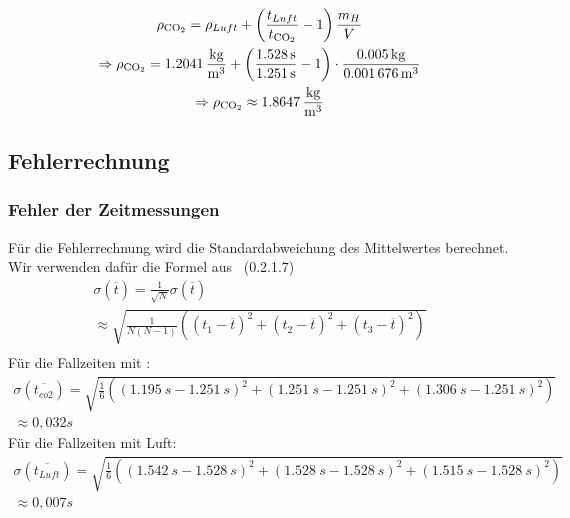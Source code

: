 \documentclass{article}
\begin{document}
      \begin{equation}
          \begin{gathered}
              \rho_{\ce{CO2}} = \rho_{Luft} + \left( \frac{t_{Luft}}{t_{\ce{CO2}}} - 1 \right) \frac{m_H}{V} \\
              \Rightarrow \rho_{\ce{CO2}} = \SI{ 1,2041 }{ \frac{kg}{m^3} } + \left( \frac{ \SI{1,528}{s} }{ \SI{1,251}{s} } - 1 \right) \cdot \frac{ \SI{0,005}{\kilogram} }{ \SI{0,001676}{m^3} } \\
              \Rightarrow \rho_{\ce{CO2}} \approx \SI{1.8647}{\frac{kg}{m^3}}
          \end{gathered}
      \end{equation}
      \subsection{Fehlerrechnung}

          \subsubsection{Fehler der Zeitmessungen}
              Für die Fehlerrechnung wird die Standardabweichung des Mittelwertes berechnet. Wir verwenden dafür die Formel aus~\cite{AnleitungPraktikum} (0.2.1.7)
              \begin{equation}
                  \begin{gathered}
                      \sigma( \overline{t} ) = \frac{1}{\sqrt{N}} \sigma(\overline{t}) \\
                      \approx \sqrt{ \frac{1}{ N (N-1) } \left( {(t_1 - \overline{t})}^2 + {( t_2 - \overline{t} )}^2 + {( t_3 - \overline{t} )}^2 \right) } \\
                  \end{gathered}
              \end{equation}
              Für die Fallzeiten mit :
              \begin{equation}
                  \begin{gathered}
                      \sigma(\overline{t_{co2}})=
                      \sqrt{ \frac{1}{6} \left( {( \SI{1,195}{s} - \SI{1,251}{s} )}^2 + {( \SI{1,251}{s} - \SI{1,251}{s} )}^2 + {( \SI{1,306}{s} - \SI{1,251}{s} )}^2 \right) } \\
                      \approx 0,032s
                  \end{gathered}
              \end{equation}
              Für die Fallzeiten mit Luft:
              \begin{equation}
                  \begin{gathered}
                      \sigma(\overline{t_{Luft}}) =
                      \sqrt{ \frac{1}{6} \left( {( \SI{1,542}{s} - \SI{1,528}{s} )}^2 + {( \SI{1,528}{s} - \SI{1,528}{s} )}^2 + {( \SI{1,515}{s} - \SI{1,528}{s} )}^2 \right) } \\
                      \approx 0,007s
                  \end{gathered}
              \end{equation}
\end{document}
